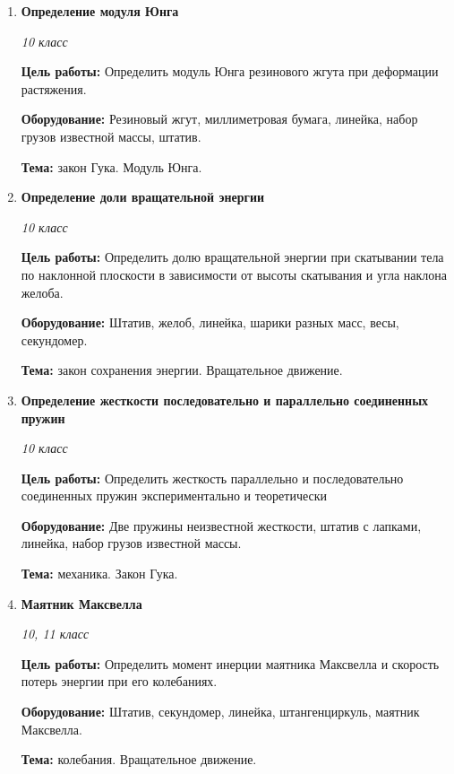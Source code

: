 \documentclass[a4paper,10pt]{article}
\newcommand{\labtitle}[5]{
	\textbf{#2}\par
	\textit{#1 класс}\par
	\textbf{Цель работы:} #3\par
	\textbf{Оборудование:} #4\par
	\textbf{Тема:} #5
}
\begin{document}
\begin{enumerate}
		{10}
		{Определение коэффициента трения}
		{Определить коэффициент трения между деревом и деревом; между деревом и материалом, покрывающим стол.}
		{Штатив, две ученические линейки.}
		{сухое трение.}
	\item \labtitle
		{10}
		{Определение модуля Юнга}
		{Определить модуль Юнга резинового жгута при деформации растяжения.}
		{Резиновый жгут, миллиметровая бумага, линейка, набор грузов известной массы, штатив.}
		{закон Гука. Модуль Юнга.}
	\item \labtitle
		{10}
		{Определение доли вращательной энергии}
		{Определить долю вращательной энергии при скатывании тела по наклонной плоскости в зависимости от высоты скатывания и угла наклона желоба.}
		{Штатив, желоб, линейка, шарики разных масс, весы, секундомер.}
		{закон сохранения энергии. Вращательное движение.}
	\item \labtitle
		{10}
		{Определение жесткости последовательно и параллельно соединенных пружин}
		{Определить жесткость параллельно и последовательно соединенных пружин экспериментально и теоретически}
		{Две пружины неизвестной жесткости, штатив с лапками, линейка, набор грузов известной массы.}
		{механика. Закон Гука.}
	\item \labtitle
		{10, 11}
		{Маятник Максвелла}
		{Определить момент инерции маятника Максвелла и скорость потерь энергии при его колебаниях.}
		{Штатив, секундомер, линейка, штангенциркуль, маятник Максвелла.}
		{колебания. Вращательное движение.}


\end{enumerate}
\end{document}
